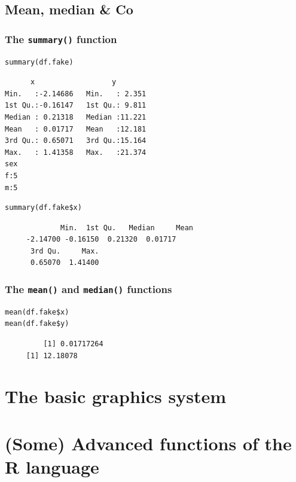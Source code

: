 \documentclass[bigger]{beamer}
\begin{document}
\subsection{Mean, median \& Co}
\label{sec-5-2}
\begin{frame}[fragile,shrink=5]
\frametitle{The \texttt{summary()} function}
\label{sec-5-2-1}


\lstset{language=R}
\begin{lstlisting}
summary(df.fake)
\end{lstlisting}

    
\begin{verbatim}
      x                  y         
Min.   :-2.14686   Min.   : 2.351  
1st Qu.:-0.16147   1st Qu.: 9.811  
Median : 0.21318   Median :11.221  
Mean   : 0.01717   Mean   :12.181  
3rd Qu.: 0.65071   3rd Qu.:15.164  
Max.   : 1.41358   Max.   :21.374  
sex  
f:5  
m:5
\end{verbatim}


\lstset{language=R}
\begin{lstlisting}
summary(df.fake$x)
\end{lstlisting}

\begin{verbatim}
             Min.  1st Qu.   Median     Mean 
     -2.14700 -0.16150  0.21320  0.01717 
      3rd Qu.     Max. 
      0.65070  1.41400
\end{verbatim}
\end{frame}
\begin{frame}[fragile]
\frametitle{The \texttt{mean()} and \texttt{median()} functions}
\label{sec-5-2-2}


\lstset{language=R}
\begin{lstlisting}
mean(df.fake$x)
mean(df.fake$y)
\end{lstlisting}

\begin{verbatim}
         [1] 0.01717264
     [1] 12.18078
\end{verbatim}
\end{frame}
\section{The basic graphics system}
\label{sec-6}
\section{(Some) Advanced functions of the R language}
\label{sec-7}
\end{document}
